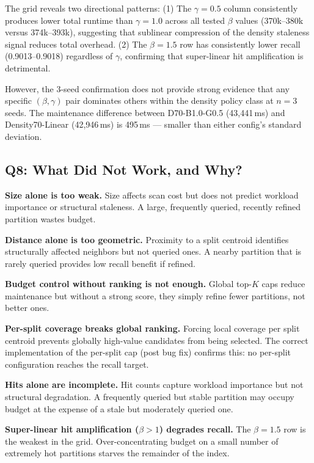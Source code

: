 \documentclass[sigconf, nonacm]{acmart}
\begin{document}
The grid reveals two directional patterns:
(1) The $\gamma=0.5$ column consistently produces lower total runtime
than $\gamma=1.0$ across all tested $\beta$ values (370k--380k versus
374k--393k), suggesting that sublinear compression of the density
staleness signal reduces total overhead.
(2) The $\beta=1.5$ row has consistently lower recall (0.9013--0.9018)
regardless of $\gamma$, confirming that super-linear hit amplification
is detrimental.

However, the 3-seed confirmation does not provide strong evidence that
any specific $(\beta, \gamma)$ pair dominates others within the density
policy class at $n=3$ seeds. The maintenance difference between
D70-B1.0-G0.5 (43,441\,ms) and Density70-Linear (42,946\,ms) is
495\,ms --- smaller than either config's standard deviation.

\subsection{Q8: What Did Not Work, and Why?}
\label{sec:eval_q8}

\textbf{Size alone is too weak.}
Size affects scan cost but does not predict workload importance or
structural staleness. A large, frequently queried, recently refined
partition wastes budget.

\textbf{Distance alone is too geometric.}
Proximity to a split centroid identifies structurally affected neighbors
but not queried ones. A nearby partition that is rarely queried provides
low recall benefit if refined.

\textbf{Budget control without ranking is not enough.}
Global top-$K$ caps reduce maintenance but without a strong score,
they simply refine fewer partitions, not better ones.

\textbf{Per-split coverage breaks global ranking.}
Forcing local coverage per split centroid prevents globally high-value
candidates from being selected. The correct implementation of the
per-split cap (post bug fix) confirms this: no per-split configuration
reaches the recall target.

\textbf{Hits alone are incomplete.}
Hit counts capture workload importance but not structural degradation.
A frequently queried but stable partition may occupy budget at the
expense of a stale but moderately queried one.

\textbf{Super-linear hit amplification ($\beta > 1$) degrades recall.}
The $\beta=1.5$ row is the weakest in the grid. Over-concentrating
budget on a small number of extremely hot partitions starves the
remainder of the index.
\end{document}
